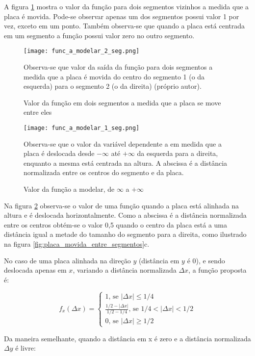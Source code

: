 A figura \ref{fig:func_a_modelar_2_seg} mostra o valor da função para
dois segmentos vizinhos a medida que a placa é movida. Pode-se observar apenas
um dos segmentos possui valor 1 por vez, exceto em um ponto. Também observa-se
que quando a placa está centrada em um segmento a função possui valor zero
no outro segmento.

\begin{figure}[!htb]
	\centering
	\texttt{[image: func\_a\_modelar\_2\_seg.png]}
	\caption{Valor da função em dois segmentos a medida que a placa se move
	entre eles}
	\label{fig:func_a_modelar_2_seg}
	Observa-se que valor da saída da função para dois segmentos a medida que a
	placa é movida do centro do segmento 1 (o da esquerda) para o segmento 2 (o
	da direita) (próprio autor).
\end{figure}

\begin{figure}[!htb]
	\centering
	\texttt{[image: func\_a\_modelar\_1\_seg.png]}
	\caption{Valor da função a modelar, de $\infty$ a $+\infty$}
	\label{fig:func_a_modelar_1_seg}
	Observa-se que o valor da variável dependente a em medida que a placa
	é deslocada desde $-\infty$ até $+\infty$ da esquerda para a direita,
	enquanto a mesma está centrada na altura. A abscissa é a distância
	normalizada entre os centros do segmento e da placa.
\end{figure}

Na figura \ref{fig:func_a_modelar_1_seg} observa-se o valor de uma função
quando a placa está alinhada na altura e é deslocada horizontalmente. Como
a abscissa é a distância normalizada entre os centros obtém-se o valor 0,5
quando o centro da placa está a uma distância igual a metade do tamanho do
segmento para a direita, como ilustrado na figura
\ref{fig:placa_movida_entre_segmentos}c.

No caso de uma placa alinhada na direção $y$ (distância em $y$ é 0), e sendo
deslocada apenas em $x$, variando a distância normalizada $\Delta x$, a função
proposta é:

\begin{equation}
	f_x(\Delta x) = \begin{cases}
		1 \text{, se } |\Delta x| \leq 1/4
		\\
		\frac{1/2-|\Delta x|}{1/2-1/4} \text{, se } 1/4<|\Delta x|<1/2
		\\
		0 \text{, se } |\Delta x| \geq 1/2
	\end{cases}
\end{equation}

Da maneira semelhante, quando a distância em x é zero e a distância 
normalizada $\Delta y$ é livre:

